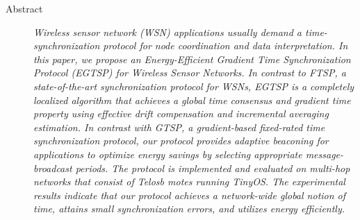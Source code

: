 \documentclass{res}
\begin{document}
\begin{resume}
\begin{itemize}
\begin{description}
		\item[Abstract]{\sl \small Wireless sensor network (WSN) applications usually demand a time-synchronization protocol for node coordination and data interpretation. In this paper, we propose an Energy-Efficient Gradient Time Synchronization Protocol (EGTSP) for Wireless Sensor Networks. In contrast to FTSP, a state-of-the-art synchronization protocol for WSNs, EGTSP is a completely localized algorithm that achieves a global time consensus and gradient time property using effective drift compensation and incremental averaging estimation. In contrast with GTSP, a gradient-based fixed-rated time synchronization protocol, our protocol provides adaptive beaconing for applications to optimize energy savings by selecting appropriate message-broadcast periods. The protocol is implemented and evaluated on multi-hop networks that consist of Telosb motes running TinyOS. The experimental results indicate that our protocol achieves a network-wide global notion of time, attains small synchronization errors, and utilizes energy efficiently.}
		\end{description}
  \end{itemize}
\newpage

\end{resume}
\end{document}
